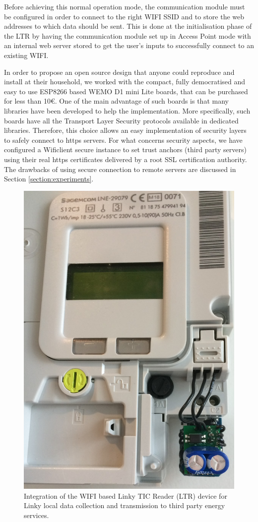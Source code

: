 \documentclass[conference]{IEEEtran}
\begin{document}
Before achieving this normal operation mode, the communication module must be configured in order to connect to the right WIFI SSID and to store the web addresses to which data should be sent. This is done at the initialisation phase of the LTR by having the communication module set up in Access Point mode with an internal web server stored to get the user's inputs to  successfully connect to an existing WIFI. 

In order to propose an open source design that anyone could reproduce and install at their household, we worked with the compact, fully democratised and easy to use ESP8266 based WEMO D1 mini Lite boards, that can be purchased for less than 10€. One of the main advantage of such boards is that many libraries have been developed to help the implementation. More specifically, such boards have all the Transport Layer Security protocols available in dedicated libraries. Therefore, this choice  allows an easy implementation of security layers to safely connect to https servers. For what concerns security aspects, we have configured a Wificlient secure instance to set trust anchors (third party servers) using their real https  certificates delivered by a root SSL certification authority. The drawbacks of using secure connection to remote servers are discussed in Section \ref{section:experiments}.


\begin{figure}[h]
	\centering
	\includegraphics[width=0.5\columnwidth]{Images/dongle_Linky.jpg}
	\caption{Integration of the WIFI based Linky TIC Reader (LTR) device for Linky local data collection and transmission to third party energy services.}
	\label{Fig:dongle_Linky}
\end{figure}
\end{document}
